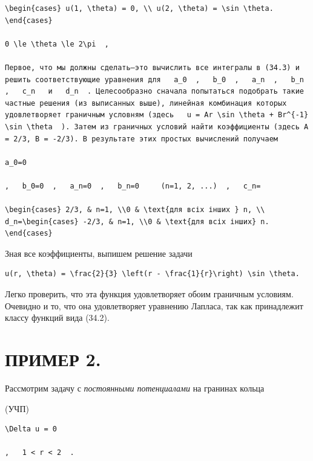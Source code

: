 \documentclass[
  ukrainian,
]{article}
\begin{document}
\begin{verbatim}
\begin{cases} u(1, \theta) = 0, \\ u(2, \theta) = \sin \theta. \end{cases}

0 \le \theta \le 2\pi  ,

Первое, что мы должны сделать—это вычислить все интегралы в (34.3) и решить соответствующие уравнения для   a_0  ,   b_0  ,   a_n  ,   b_n  ,   c_n   и   d_n  . Целесообразно сначала попытаться подобрать такие частные решения (из выписанных выше), линейная комбинация которых удовлетворяет граничным условням (здесь   u = Ar \sin \theta + Br^{-1} \sin \theta  ). Затем из граничных условий найти коэффициенты (здесь A = 2/3, B = -2/3). В результате этих простых вычислений получаем

a_0=0

,   b_0=0  ,   a_n=0  ,   b_n=0     (n=1, 2, ...)  ,   c_n=

\begin{cases} 2/3, & n=1, \\0 & \text{для всіх інших } n, \\ d_n=\begin{cases} -2/3, & n=1, \\0 & \text{для всіх інших} n. \end{cases}
\end{verbatim}

Зная все коэффициенты, выпишем решение задачи

\begin{verbatim}
u(r, \theta) = \frac{2}{3} \left(r - \frac{1}{r}\right) \sin \theta.
\end{verbatim}

Легко проверить, что эта функция удовлетворяет обоим граничным условиям.
Очевидно и то, что она удовлетворяет уравнению Лапласа, так как
принадлежит классу функций вида (34.2).

\section{ПРИМЕР 2.}\label{ux43fux440ux438ux43cux435ux440-2.}

Рассмотрим задачу с \emph{постоянными потенциалами} на гранинах кольца

(УЧП)

\begin{verbatim}
\Delta u = 0

,   1 < r < 2  .
\end{verbatim}
\end{document}
